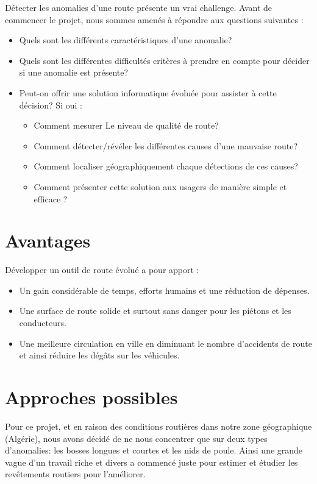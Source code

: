 Détecter les anomalies d'une route présente un vrai challenge. Avant de commencer le projet,  
 nous sommes amenés à répondre aux questions suivantes :
\begin{itemize}
  \item Quels sont les différents caractéristiques d'une anomalie?
  \item Quels sont les différentes difficultés critères à prendre en compte pour décider si une anomalie est présente?
	\item Peut-on offrir une solution informatique évoluée pour assister à cette décision? Si oui : 
        \begin{itemize}
            \item Comment mesurer Le niveau de qualité de route?
            \item Comment détecter/révéler les différentes causes d'une mauvaise route?
	      	  \item Comment localiser géographiquement chaque détections de ces causes?
	      	  \item Comment présenter cette solution aux usagers de manière simple et efficace ?
	      \end{itemize}
\end{itemize}

   \section{Avantages}
  Développer un outil de route évolué a pour apport :
    \begin{itemize}
	  \item Un gain considérable de temps, efforts humains et une réduction de dépenses.
    \item Une surface de route solide et surtout sans danger pour les piétons et les conducteurs.
    \item Une meilleure circulation en ville en diminuant le nombre d'accidents de route et ainsi réduire les dégâts sur les véhicules.
    \end{itemize}


\section{Approches possibles}  
Pour ce projet, et en raison des conditions routières dans notre zone géographique (Algérie), nous avons décidé de ne nous concentrer que 
sur deux types d'anomalies: les bosses longues et courtes et les nids de poule.\newline
Ainsi une grande vague d'un travail riche et divers a commencé juste pour estimer et étudier les revêtements routiers pour l'améliorer.

